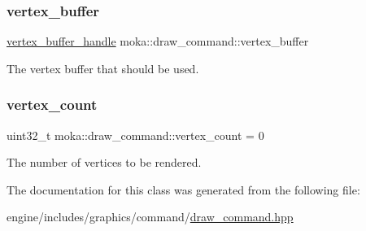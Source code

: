 \subsubsection{\texorpdfstring{vertex\_buffer}{vertex\_buffer}}
{\footnotesize\ttfamily \mbox{\hyperlink{structmoka_1_1vertex__buffer__handle}{vertex\+\_\+buffer\+\_\+handle}} moka\+::draw\+\_\+command\+::vertex\+\_\+buffer}

The vertex buffer that should be used. \mbox{\label{classmoka_1_1draw__command_a6a2c0c076a81ca8b7f81b3f40a471728}} 
\subsubsection{\texorpdfstring{vertex\_count}{vertex\_count}}
{\footnotesize\ttfamily uint32\+\_\+t moka\+::draw\+\_\+command\+::vertex\+\_\+count = 0}

The number of vertices to be rendered. 

The documentation for this class was generated from the following file\+:\begin{DoxyCompactItemize}
\item 
engine/includes/graphics/command/\mbox{\hyperlink{draw__command_8hpp}{draw\+\_\+command.\+hpp}}\end{DoxyCompactItemize}
